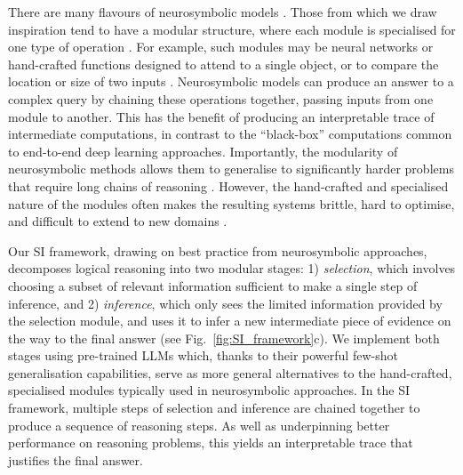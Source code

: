 There are many flavours of neurosymbolic models \citep{garcez2020neurosymbolic}. Those from which we draw inspiration tend to have a modular structure, where each module is specialised for one type of operation \citep{mao2019neuro, andreas2016neural}. For example, such modules may be neural networks or hand-crafted functions designed to attend to a single object, or to compare the location or size of two inputs \citep{andreas2016neural, yi2018neural}. Neurosymbolic models can produce an answer to a complex query by chaining these operations together, passing inputs from one module to another. This has the benefit of producing an interpretable trace of intermediate computations, in contrast to the ``black-box'' computations common to end-to-end deep learning approaches. Importantly, the modularity of neurosymbolic methods allows them to generalise to significantly harder problems that require long chains of reasoning \citep{hudson2019learning}. However, the hand-crafted and specialised nature of the modules often makes the resulting systems brittle, hard to optimise, and difficult to extend to new domains \citep{yi2018neural}.

Our SI framework, drawing on best practice from neurosymbolic approaches, decomposes logical reasoning into two modular stages: 1) \emph{selection}, which involves choosing a subset of relevant information sufficient to make a single step of inference, and 2) \emph{inference}, which only sees the limited information provided by the selection module, and uses it to infer a new intermediate piece of evidence on the way to the final answer (see Fig.~\ref{fig:SI_framework}c). We implement both stages using pre-trained LLMs which, thanks to their powerful few-shot generalisation capabilities, serve as more general alternatives to the hand-crafted, specialised modules typically used in neurosymbolic approaches. In the SI framework, multiple steps of selection and inference are chained together to produce a sequence of reasoning steps. As well as underpinning better performance on reasoning problems, this yields an interpretable trace that justifies the final answer.

